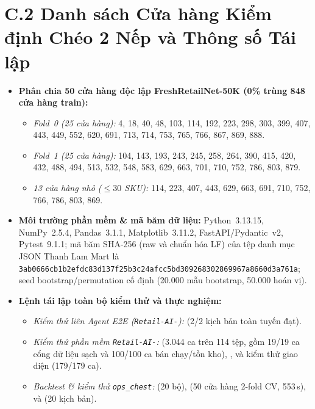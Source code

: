 \section*{C.2 Danh sách Cửa hàng Kiểm định Chéo 2 Nếp và Thông số Tái lập}
\begin{itemize}
    \item \textbf{Phân chia 50 cửa hàng độc lập FreshRetailNet-50K (0\% trùng 848 cửa hàng train):}
    \begin{itemize}
        \item \emph{Fold~0 (25 cửa hàng):} 4, 18, 40, 48, 103, 114, 192, 223, 298, 303, 399, 407, 443, 449, 552, 620, 691, 713, 714, 753, 765, 766, 867, 869, 888.
        \item \emph{Fold~1 (25 cửa hàng):} 104, 143, 193, 243, 245, 258, 264, 390, 415, 420, 432, 488, 494, 513, 532, 548, 583, 629, 663, 701, 710, 752, 786, 803, 879.
        \item \emph{13 cửa hàng nhỏ ($\le 30$ SKU):} 114, 223, 407, 443, 629, 663, 691, 710, 752, 766, 786, 803, 869.
    \end{itemize}
    \item \textbf{Môi trường phần mềm \& mã băm dữ liệu:} Python~3.13.15, NumPy~2.5.4, Pandas~3.1.1, Matplotlib~3.11.2, FastAPI/Pydantic~v2, Pytest~9.1.1; mã băm SHA-256 (raw và chuẩn hóa LF) của tệp danh mục JSON Thanh Lam Mart là \texttt{\small 3ab0666cb1b2efdc\allowbreak 83d137f25b3c24af\allowbreak cc5bd30926830286\allowbreak 9967a8660d3a761a}; seed bootstrap/permutation cố định  (20.000 mẫu bootstrap, 50.000 hoán vị).
    \item \textbf{Lệnh tái lập toàn bộ kiểm thử và thực nghiệm:}
    \begin{itemize}
        \item \emph{Kiểm thử liên Agent E2E (\texttt{Retail-AI-}):}  (2/2 kịch bản toàn tuyến đạt).
        \item \emph{Kiểm thử phần mềm \texttt{Retail-AI-}:}  (3.044 ca trên 114 tệp, gồm 19/19 ca cổng dữ liệu sạch và 100/100 ca bán chạy/tồn kho), , và kiểm thử giao diện  (179/179 ca).
        \item \emph{Backtest \& kiểm thử \texttt{ops\_chest}:}  (20 bộ),  (50 cửa hàng 2-fold CV, 553\,s), và  (20 kịch bản).
    \end{itemize}
\end{itemize}
